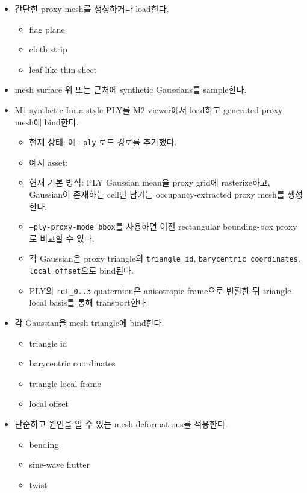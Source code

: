\documentclass[10pt]{article}
\newcommand{\done}{\textcolor{DoneGreen}{\(\boxtimes\)}}
\newcommand{\code}[1]{\texttt{#1}}
\begin{document}
\begin{itemize}
  \item[\done] 간단한 proxy mesh를 생성하거나 load한다.
    \begin{itemize}
      \item flag plane
      \item cloth strip
      \item leaf-like thin sheet
    \end{itemize}
  \item[\done] mesh surface 위 또는 근처에 synthetic Gaussians를 sample한다.
  \item[\done] M1 synthetic Inria-style PLY를 M2 viewer에서 load하고 generated proxy mesh에 bind한다.
    \begin{itemize}
      \item 현재 상태: 에 \code{--ply} 로드 경로를 추가했다.
      \item 예시 asset: 
      \item 현재 기본 방식: PLY Gaussian mean을 proxy grid에 rasterize하고, Gaussian이 존재하는 cell만 남기는 occupancy-extracted proxy mesh를 생성한다.
      \item \code{--ply-proxy-mode bbox}를 사용하면 이전 rectangular bounding-box proxy로 비교할 수 있다.
      \item 각 Gaussian은 proxy triangle의 \code{triangle\_id}, \code{barycentric coordinates}, \code{local offset}으로 bind된다.
      \item PLY의 \code{rot\_0..3} quaternion은 anisotropic frame으로 변환한 뒤 triangle-local basis를 통해 transport한다.
    \end{itemize}
  \item[\done] 각 Gaussian을 mesh triangle에 bind한다.
    \begin{itemize}
      \item triangle id
      \item barycentric coordinates
      \item triangle local frame
      \item local offset
    \end{itemize}
  \item[\done] 단순하고 원인을 알 수 있는 mesh deformations를 적용한다.
    \begin{itemize}
      \item bending
      \item sine-wave flutter
      \item twist

\end{itemize}
\end{itemize}
\end{document}
